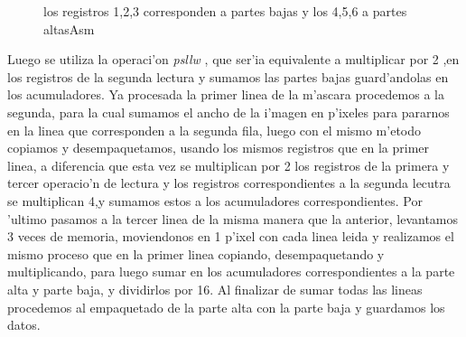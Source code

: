 \begin{figure}[h!]
\caption{los registros 1,2,3 corresponden a partes bajas y los 4,5,6 a partes altasAsm}
\label{est:s-tres}
\end{figure}
Luego se utiliza la operaci'on \textit{psllw} , que ser'ia equivalente a multiplicar por 2 ,en los registros de la segunda lectura 
y sumamos las partes bajas guard'andolas en los acumuladores.
Ya procesada la primer linea de la m'ascara procedemos a la segunda, para la cual sumamos el ancho de la i'magen en 
p'ixeles para pararnos en la linea que corresponden a la segunda fila, luego con el mismo m'etodo copiamos y desempaquetamos, 
usando los mismos registros que en la primer linea, a diferencia que esta vez se multiplican por 2 los 
registros de la primera y tercer operacio'n de lectura y los registros correspondientes a la segunda lecutra se multiplican 4,y sumamos estos a los acumuladores correspondientes.
Por 'ultimo pasamos a la tercer linea de la misma manera que la anterior, levantamos 3 veces de memoria, moviendonos en 1 
p'ixel con cada linea leida y realizamos el mismo proceso que en la primer linea copiando, desempaquetando y multiplicando,
para luego sumar en los acumuladores correspondientes a la parte alta y parte baja, y dividirlos por 16.
Al finalizar de sumar todas las lineas procedemos al empaquetado de la parte alta con la parte baja y guardamos los datos.



